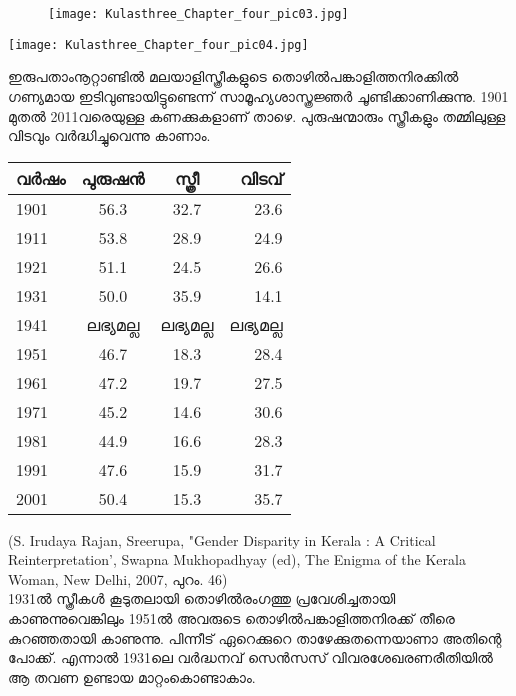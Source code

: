 \begin{figure}[h]
\begin{center}
\texttt{[image: Kulasthree\_Chapter\_four\_pic03.jpg]}
\end{center}
\end{figure}



\label{ch4box1} %
\begin{tcolorbox}[%
 breakable, %
  arc=0mm, 
  left=1pt, right = 1pt, 
  boxrule=0mm,
  colback = {blue!10}, %
] 

\begin{center}
\texttt{[image: Kulasthree\_Chapter\_four\_pic04.jpg]}
\end{center}
ഇരുപതാംനൂറ്റാണ്ടിൽ മലയാളിസ്ത്രീകളുടെ തൊഴിൽപങ്കാളിത്തനിരക്കിൽ ഗണ്യമായ ഇടിവുണ്ടായിട്ടുണ്ടെന്ന് സാമൂഹ്യശാസ്ത്രജ്ഞർ ചൂണ്ടിക്കാണിക്കുന്നു. 1901 മുതൽ 2011വരെയുള്ള കണക്കുകളാണ് താഴെ. പുരുഷന്മാരും സ്ത്രീകളും തമ്മിലുള്ള വിടവും വർദ്ധിച്ചുവെന്നു കാണാം. 

\begin{tabular}{ l c c r }
വർഷം &	പുരുഷൻ	& സ്ത്രീ &	വിടവ് \\
\hline
1901 &	56.3	&  32.7&	23.6\\
1911	& 53.8	& 28.9	& 24.9\\
1921&	51.1&	24.5&	26.6\\
1931	&50.0&	35.9&	14.1\\
1941&	ലഭ്യമല്ല&	ലഭ്യമല്ല	&ലഭ്യമല്ല\\
1951&	46.7&	18.3	&28.4\\
1961	&47.2	&19.7&	27.5\\
1971&	45.2	&14.6&	30.6\\
1981&	44.9&	16.6&	28.3\\
1991&	47.6&	15.9&	31.7\\
2001&	50.4	&15.3&	35.7\\
\end{tabular}

(S. Irudaya Rajan, Sreerupa, "Gender Disparity in Kerala : A Critical Reinterpretation', Swapna Mukhopadhyay (ed), The Enigma of the Kerala Woman, New Delhi, 2007, പുറം. 46)
\\
1931ൽ സ്ത്രീകൾ കൂടുതലായി തൊഴിൽരംഗത്തു പ്രവേശിച്ചതായി കാണുന്നുവെങ്കിലും 1951ൽ അവരുടെ തൊഴിൽപങ്കാളിത്തനിരക്ക് തീരെ കുറഞ്ഞതായി കാണുന്നു. പിന്നീട് ഏറെക്കുറെ താഴേക്കുതന്നെയാണാ അതിന്റെ പോക്ക്. എന്നാൽ 1931ലെ വർദ്ധനവ് സെൻസസ് വിവരശേഖരണരീതിയിൽ ആ തവണ ഉണ്ടായ മാറ്റംകൊണ്ടാകാം.
\end{tcolorbox}



